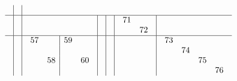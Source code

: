 \documentclass[12pt,a4paper]{amsart}
\begin{document}
\begin{align*}
\begin{array}{c|c|c|c|c|c|c}
& \\\hline
&&&&&
\begin{array}{rr}%
71&  \\%
  &72\\%
\end{array}%
\\\hline
&&
\begin{array}{rr|rr}%
57&  &59&  \\%
  &  &  &  \\%
  &58&  &60\\%
  &  &  &  \\%
\end{array}%
&&&&
\begin{array}{rrrr}%
73&  &  &  \\%
  &74&  &  \\%
  &  &75&  \\%
  &  &  &76\\%
\end{array}%
\end{array}
\end{align*}
\end{document}
